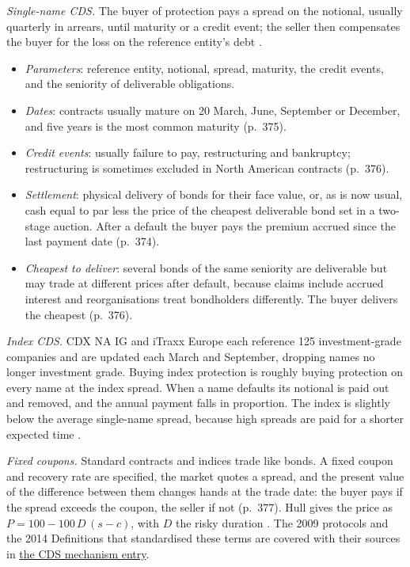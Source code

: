 \begin{qfdefinition}\label{def:cds-contract-features}
 \emph{Single-name CDS.} The buyer of protection pays a spread on the notional, usually quarterly in arrears, until maturity or a credit event; the seller then compensates the buyer for the loss on the reference entity's debt \citep[pp.~372--374]{risk-management-financial-institutions-2023}.
\begin{itemize}
\item \emph{Parameters}: reference entity, notional, spread, maturity, the credit events, and the seniority of deliverable obligations.
\item \emph{Dates}: contracts usually mature on 20 March, June, September or December, and five years is the most common maturity (p.~375).
\item \emph{Credit events}: usually failure to pay, restructuring and bankruptcy; restructuring is sometimes excluded in North American contracts (p.~376).
\item \emph{Settlement}: physical delivery of bonds for their face value, or, as is now usual, cash equal to par less the price of the cheapest deliverable bond set in a two-stage auction. After a default the buyer pays the premium accrued since the last payment date (p.~374).
\item \emph{Cheapest to deliver}: several bonds of the same seniority are deliverable but may trade at different prices after default, because claims include accrued interest and reorganisations treat bondholders differently. The buyer delivers the cheapest (p.~376).
\end{itemize}

\emph{Index CDS.} CDX NA IG and iTraxx Europe each reference 125 investment-grade companies and are updated each March and September, dropping names no longer investment grade. Buying index protection is roughly buying protection on every name at the index spread. When a name defaults its notional is paid out and removed, and the annual payment falls in proportion. The index is slightly below the average single-name spread, because high spreads are paid for a shorter expected time \citep[pp.~376--377]{risk-management-financial-institutions-2023}.

\emph{Fixed coupons.} Standard contracts and indices trade like bonds. A fixed coupon and recovery rate are specified, the market quotes a spread, and the present value of the difference between them changes hands at the trade date: the buyer pays if the spread exceeds the coupon, the seller if not (p.~377). Hull gives the price as $P=100-100\,D\,(s-c)$, with $D$ the risky duration \citep[p.~596]{s7-hulloptions}. The 2009 protocols and the 2014 Definitions that standardised these terms are covered with their sources in \hyperref[mech:cds-contract-credit-events]{the CDS mechanism entry}.


\end{qfdefinition}
